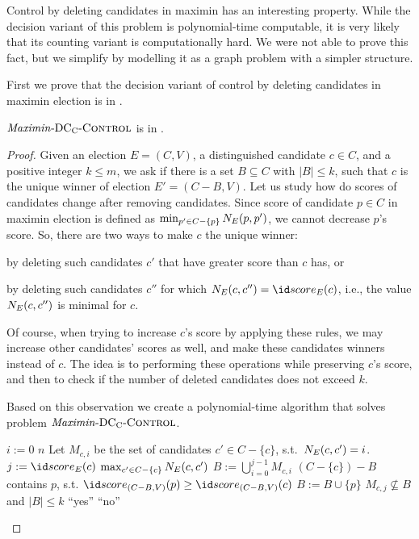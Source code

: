 Control by deleting candidates in maximin has an interesting property.
While the decision variant of this problem is polynomial-time computable, it is very likely that its counting variant is computationally hard.
We were not able to prove this fact, but we simplify  by modelling it as a graph problem with a simpler structure.

First we prove that the decision variant of control by deleting candidates in maximin election is in \Pclass.

\begin{theorem} \label{th:mmdcc}
	${\it Maximin\/}\textnormal{-DC${}_\textnormal{C}$-}\textsc{Control}$ is in \Pclass.
\end{theorem}

\begin{proof}
Given an election $E=(C,V)$, a distinguished candidate $c\in C$, and a positive integer $k\le m$, we ask if there is a set $B\subseteq C$ with $|B|\le k$, such that $c$ is the unique winner of election $E'=(C-B,V)$.
Let us study how do scores of candidates change after removing candidates.
Since score of candidate $p\in C$ in maximin election is defined as $\min_{p'\in C-\{p\}}N_{E}(p,p')$, we cannot decrease $p$'s score.
So, there are two ways to make $c$ the unique winner:
\begin{Enumerate}
	\item by deleting such candidates $c'$ that have greater score than $c$ has, or
	\item by deleting such candidates $c''$ for which $\beaten{E}(c,c'')=\score{E}(c)$, i.e., the value $N_{E}(c,c'')$ is minimal for $c$.
\end{Enumerate}
Of course, when trying to increase $c$'s score by applying these rules, we may increase other candidates' scores as well, and make these candidates winners instead of $c$.
The idea is to performing these operations while preserving $c$'s score, and then to check if the number of deleted candidates does not exceed $k$.

Based on this observation we create a polynomial-time algorithm that solves problem ${\it Maximin\/}\textnormal{-DC${}_\textnormal{C}$-}\textsc{Control}$.

\begin{codebox}
\li	\For $i:=0$ \To $n$
\li		\Do Let $M_{c,i}$ be the set of candidates $c'\in C-\{c\}$, s.t.\ $N_{E}(c,c')=i$.
		\End
\li	\For $j:=\score{E}(c)$ \To $\max_{c'\in C-\{c\}}N_{E}(c,c')$ \label{mmdcc:main_loop_beg}
\li		\Do
			$B:=\bigcup_{i=0}^{j-1}M_{c,i}$
\li			\While $(C-\{c\})-B$ contains $p$, s.t. $\score{(C-B,V)}(p)\ge\score{(C-B,V)}(c)$ \label{mmdcc:greedy_beg}
\li				\Do $B:=B\cup\{p\}$
				\End \label{mmdcc:greedy_end}
\li			\If $M_{c,j}\nsubseteq B$ and $|B|\le k$
\li				\Then \Return ``yes''
				\End
		\End \label{mmdcc:main_loop_end}
\li	\Return ``no''
\end{codebox}


\end{proof}
